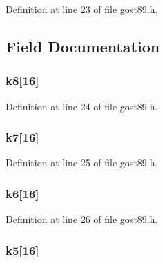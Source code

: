 Definition at line 23 of file gost89.\+h.



\subsection{Field Documentation}
\subsubsection[{\texorpdfstring{k8}{k8}}]{ k8\mbox{[}16\mbox{]}}\hypertarget{structgost__subst__block_a2985f897970ba11bec36f04fd11596c4}{}\label{structgost__subst__block_a2985f897970ba11bec36f04fd11596c4}


Definition at line 24 of file gost89.\+h.

\subsubsection[{\texorpdfstring{k7}{k7}}]{ k7\mbox{[}16\mbox{]}}\hypertarget{structgost__subst__block_a668b60b0b5c50972b049cbf64c2dcfe6}{}\label{structgost__subst__block_a668b60b0b5c50972b049cbf64c2dcfe6}


Definition at line 25 of file gost89.\+h.

\subsubsection[{\texorpdfstring{k6}{k6}}]{ k6\mbox{[}16\mbox{]}}\hypertarget{structgost__subst__block_a92b0d370647438b8f833b447097130bb}{}\label{structgost__subst__block_a92b0d370647438b8f833b447097130bb}


Definition at line 26 of file gost89.\+h.

\subsubsection[{\texorpdfstring{k5}{k5}}]{ k5\mbox{[}16\mbox{]}}\hypertarget{structgost__subst__block_a6b91b882555222d6234042987193c336}{}\label{structgost__subst__block_a6b91b882555222d6234042987193c336}


